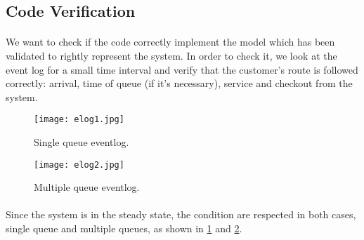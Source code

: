\subsection{Code Verification}
\paragraph{}
We want to check if the code correctly implement the model which has been validated to rightly represent the system. In order to check it, we look at the event log for a small time interval and verify that the customer's route is followed correctly: arrival, time of queue (if it's necessary), service and checkout from the system.

\begin{figure}[h]
  \begin{center}
  \texttt{[image: elog1.jpg]}
  \caption{Single queue eventlog.}
  \label{fig:elogs}
  \end{center}
\end{figure}
\begin{figure}[h]
  \begin{center}
  \texttt{[image: elog2.jpg]}
  \caption{Multiple queue eventlog.}
  \label{fig:elogm}
  \end{center}
\end{figure}

\paragraph{} Since the system is in the steady state, the condition are respected in both cases, single queue and multiple queues, as shown in \ref{fig:elogs} and \ref{fig:elogm}.
